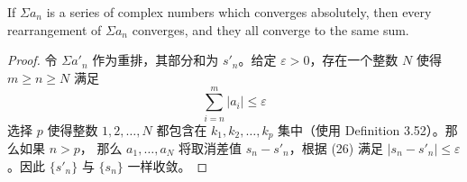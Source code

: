 \documentclass[../poma-notes.tex]{subfiles}
\begin{document}

\begin{theorem}
  If $\Sigma a_n$ is a series of complex numbers which converges absolutely, then every rearrangement of
  $\Sigma a_n$ converges, and they all converge to the same sum.
\end{theorem}

\begin{proof}
  令 $\Sigma a'_n$ 作为重排，其部分和为 $s'_n$。给定 $\varepsilon > 0$，存在一个整数 $N$ 使得 $m \ge n \ge N$ 满足
  \begin{equation}
    \sum_{i=n}^{m} |a_i| \le \varepsilon
  \end{equation}
  选择 $p$ 使得整数 $1,2,\dots,N$ 都包含在 $k_1,k_2,\dots,k_p$ 集中（使用 Definition 3.52）。那么如果 $n > p$，
  那么 $a_1,\dots,a_N$ 将取消差值 $s_n - s'_n$，根据 (26) 满足 $|s_n - s'_n| \le \varepsilon$。因此 $\{s'_n\}$
  与 $\{s_n\}$ 一样收敛。
\end{proof}
\end{document}
